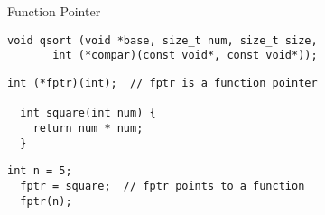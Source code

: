 \begin{frame}{}
  \centerline{\LARGE Function Pointer}
\end{frame}

\begin{frame}[fragile]{}
  \centerline{\large {}}

  \vspace{0.30cm}
  \begin{lstlisting}[style = Cstyle]
  void qsort (void *base, size_t num, size_t size,
       int (*compar)(const void*, const void*));
  \end{lstlisting}

  \pause
  \vspace{0.30cm}
  \centerline{\large {}}
\end{frame}

\begin{frame}[fragile]{}
  \begin{lstlisting}[style = Cstyle]
  int (*fptr)(int);  // fptr is a function pointer

  int square(int num) {
    return num * num;
  }
  \end{lstlisting}

  \pause
  \vspace{0.30cm}
  \begin{lstlisting}[style = Cstyle]
  int n = 5;
  fptr = square;  // fptr points to a function
  fptr(n);
  \end{lstlisting}
\end{frame}

\begin{frame}{}
\end{frame}

\begin{frame}{}
\end{frame}
